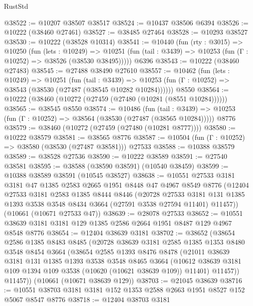 \begin{lexlean}{RustStd}
\begin{coremodule}
@38522 := @10207 @38507 @38517
@38524 := @10437 @38506 @6394
@38526 := @10222 (@38460 @27461)
@38527 := @38485 @27464
@38528 := @10293 @38527
@38530 := @10222 (@38528 @10314)
@38541 := @10440
    (fun (rty : @3015) =>
    @10250
      (fun (lets : @10249) =>
      @10251 (fun (tail : @3439) => @10253 (fun (Γ : @10252) => @38526 (@38530 @38495)))))
    @6396
@38543 := @10222 (@38460 @27483)
@38545 := @27488 @38490 @27610
@38557 := @10462
    (fun (lets : @10249) =>
    @10251
      (fun (tail : @3439) =>
      @10253 (fun (Γ : @10252) => @38543 (@38530 (@27487 (@38545 @10282 @10284))))))
    @8550
@38564 := @10222 (@38460 (@10272 (@27459 (@27480 (@10281 (@8551 @10284))))))
@38565 := @38545 @8550
@38574 := @10486
    (fun (tail : @3439) => @10253 (fun (Γ : @10252) => @38564 (@38530 (@27487 (@38565 @10284)))))
    @8776
@38579 := @38460 (@10272 (@27459 (@27480 (@10281 @8777))))
@38580 := @10222 @38579
@38581 := @38565 @8776
@38587 := @10504 (fun (Γ : @10252) => @38580 (@38530 (@27487 @38581))) @27533
@38588 := @10388 @38579
@38589 := @38528 @27536
@38590 := @10222 @38589
@38591 := @27540 @38581
@38595 := @38588 (@38590 @38591) (@10540 @38459)
@38599 := @10388 @38589 @38591 (@10545 @38527)
@38638 := @10551
    @27533
    @3181
    @3181
    @47
    @1385
    @2583
    @2665
    @1951
    @8448
    @47
    @4967
    @8549
    @8776
    (@12404
      @27533
      @3181
      @2583
      @1385
      @8444
      @8446
      (@20728
        @27533
        @3181
        @131
        @1385
        @1393
        @3538
        @3548
        @8434
        @3664
        (@27591 @3538 @27594 @11401)
        @11457))
    (@10661 (@10671 @27533 @47))
@38639 := @28078 @27533
@38652 := @10551 @38639 @3181 @3181 @129 @1385 @2586 @2664 @1951 @8487 @129 @4967 @8548 @8776
@38654 := @12404 @38639 @3181
@38702 := @38652
    (@38654
      @2586
      @1385
      @8483
      @8485
      (@20728
        @38639
        @3181
        @2585
        @1385
        @1353
        @8480
        @3548
        @8454
        @3664
        (@38654
          @2585
          @1393
          @8476
          @8478
          (@21011
            @38639
            @3181
            @131
            @1385
            @1393
            @3538
            @3548
            @8465
            @3664
            (@10612 @38639 @3181 @109 @1394 @109 @3538 (@10620 (@10621 @38639 @109)) @11401)
            @11457))
        @11457))
    (@10661 (@10671 @38639 @129))
@38703 := @21045 @38639
@38716 := @10551 @38703 @3181 @3181 @152 @1353 @2588 @2663 @1951 @8527 @152 @5067 @8547 @8776
@38718 := @12404 @38703 @3181

\end{coremodule}
\end{lexlean}

